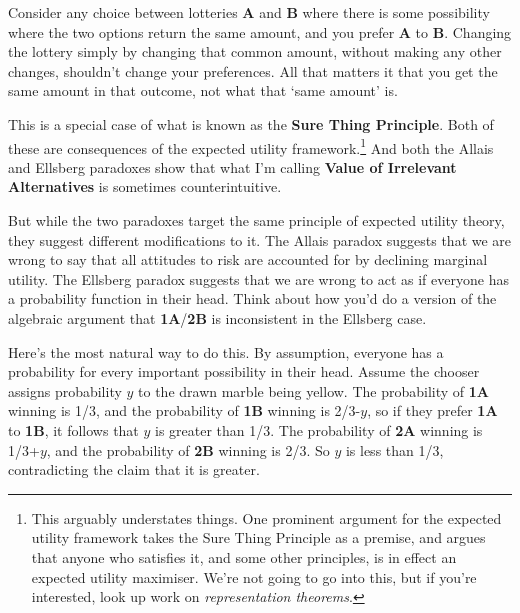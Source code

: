 \documentclass[
  11pt,
  letterpaper,
]{scrbook}
\begin{document}
\begin{tcolorbox}[enhanced jigsaw, arc=.35mm, bottomrule=.15mm, bottomtitle=1mm, breakable, colback=white, colbacktitle=quarto-callout-tip-color!10!white, colframe=quarto-callout-tip-color-frame, coltitle=black, left=2mm, leftrule=.75mm, opacityback=0, opacitybacktitle=0.6, rightrule=.15mm, title=\textcolor{quarto-callout-tip-color}{\faLightbulb}\hspace{0.5em}{Value of Irrelevant Alternatives}, titlerule=0mm, toprule=.15mm, toptitle=1mm]

Consider any choice between lotteries \textbf{A} and \textbf{B} where
there is some possibility where the two options return the same amount,
and you prefer \textbf{A} to \textbf{B}. Changing the lottery simply by
changing that common amount, without making any other changes, shouldn't
change your preferences. All that matters it that you get the same
amount in that outcome, not what that `same amount' is.

\end{tcolorbox}

This is a special case of what is known as the \textbf{Sure Thing
Principle}. Both of these are consequences of the expected utility
framework.\footnote{This arguably understates things. One prominent
  argument for the expected utility framework takes the Sure Thing
  Principle as a premise, and argues that anyone who satisfies it, and
  some other principles, is in effect an expected utility maximiser.
  We're not going to go into this, but if you're interested, look up
  work on \emph{representation theorems}.} And both the Allais and
Ellsberg paradoxes show that what I'm calling \textbf{Value of
Irrelevant Alternatives} is sometimes counterintuitive.

But while the two paradoxes target the same principle of expected
utility theory, they suggest different modifications to it. The Allais
paradox suggests that we are wrong to say that all attitudes to risk are
accounted for by declining marginal utility. The Ellsberg paradox
suggests that we are wrong to act as if everyone has a probability
function in their head. Think about how you'd do a version of the
algebraic argument that \textbf{1A}/\textbf{2B} is inconsistent in the
Ellsberg case.

Here's the most natural way to do this. By assumption, everyone has a
probability for every important possibility in their head. Assume the
chooser assigns probability \(y\) to the drawn marble being yellow. The
probability of \textbf{1A} winning is 1/3, and the probability of
\textbf{1B} winning is 2/3-\(y\), so if they prefer \textbf{1A} to
\textbf{1B}, it follows that \(y\) is greater than 1/3. The probability
of \textbf{2A} winning is 1/3+\(y\), and the probability of \textbf{2B}
winning is 2/3. So \(y\) is less than 1/3, contradicting the claim that
it is greater.
\end{document}
